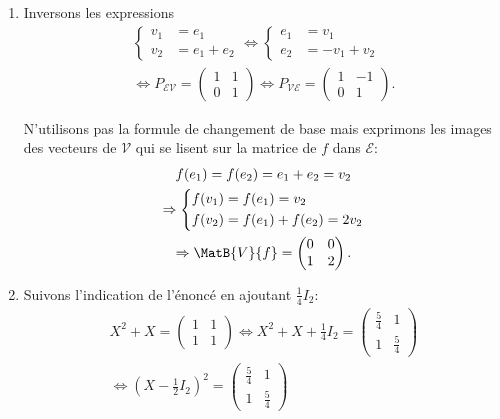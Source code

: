 \begin{enumerate}
 \item Inversons les expressions
\begin{multline*}
 \left\lbrace 
 \begin{aligned}
  v_1 &= e_1 \\ v_2 &= e_1 + e_2
 \end{aligned}
 \right. 
\Leftrightarrow
 \left\lbrace 
 \begin{aligned}
  e_1 &= v_1 \\ e_2 &= - v_1 + v_2
 \end{aligned}
 \right. \\
 \Leftrightarrow P_{\mathcal{E} \mathcal{V}} = \begin{pmatrix}
                                                1 & 1 \\ 0 & 1
                                               \end{pmatrix} 
\Leftrightarrow
P_{\mathcal{V} \mathcal{E} } = \begin{pmatrix}
                                                1 & -1 \\ 0 & 1
                                               \end{pmatrix}.
\end{multline*}

N'utilisons pas la formule de changement de base mais exprimons les images des vecteurs de $\mathcal{V}$ qui se lisent sur la matrice de $f$ dans $\mathcal{E}$:
\begin{multline*}
 f(e_1) = f(e_2)= e_1 + e_2 = v_2 \\
 \Rightarrow
 \left\lbrace 
 \begin{aligned}
  f(v_1) &= f(e_1) = v_2\\ f(v_2) &= f(e_1) + f(e_2) = 2v_2
 \end{aligned}
\right. \\
\Rightarrow
\MatB{V}{f}=
\begin{pmatrix}
 0 & 0 \\ 1 & 2
\end{pmatrix}.
\end{multline*}

 \item Suivons l'indication de l'énoncé en ajoutant $\frac{1}{4}I_2$:
\begin{multline*}
  X^2 + X = \begin{pmatrix} 1 & 1 \\ 1 & 1 \end{pmatrix}
  \Leftrightarrow
  X^2 + X + \frac{1}{4}I_2 = \begin{pmatrix} \frac{5}{4} & 1 \\ 1 & \frac{5}{4} \end{pmatrix}\\
  \Leftrightarrow
  (X - \frac{1}{2}I_2)^2 = \begin{pmatrix} \frac{5}{4} & 1 \\ 1 & \frac{5}{4} \end{pmatrix}
\end{multline*}


\end{enumerate}

